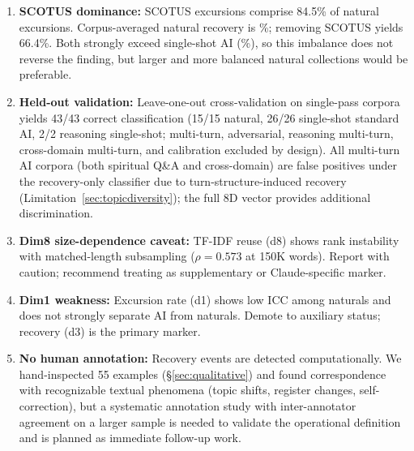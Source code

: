 \documentclass[11pt]{article}
\begin{document}
\begin{enumerate}
This identifies multi-turn generation structure as a boundary condition for the recovery-based classifier. However, multi-turn AI corpora remain distinguishable on other dimensions: d5 (compression SD) ranges 0.006--0.044, consistent with standard AI ranges and below the dialogue/channeling natural range ($\geq$0.044), though overlapping institutional/prose naturals (FOMC 0.011, Gutenberg 0.012). d8 (TF-IDF reuse) ranges 0.67--0.96, meaning the full 8-dimensional vector still provides additional discrimination.

\item \textbf{SCOTUS dominance:} SCOTUS excursions comprise 84.5\% of natural excursions. Corpus-averaged natural recovery is \recNatCorpusAvg\%; removing SCOTUS yields 66.4\%. Both strongly exceed single-shot AI (\recAISingleShot\%), so this imbalance does not reverse the finding, but larger and more balanced natural collections would be preferable.

\item \textbf{Held-out validation:} Leave-one-out cross-validation on single-pass corpora yields 43/43 correct classification (15/15 natural, 26/26 single-shot standard AI, 2/2 reasoning single-shot; multi-turn, adversarial, reasoning multi-turn, cross-domain multi-turn, and calibration excluded by design). All multi-turn AI corpora (both spiritual Q\&A and cross-domain) are false positives under the recovery-only classifier due to turn-structure-induced recovery (Limitation~\ref{sec:topicdiversity}); the full 8D vector provides additional discrimination.

\item \textbf{Dim8 size-dependence caveat:} TF-IDF reuse (d8) shows rank instability with matched-length subsampling ($\rho = 0.573$ at 150K words). Report with caution; recommend treating as supplementary or Claude-specific marker.

\item \textbf{Dim1 weakness:} Excursion rate (d1) shows low ICC among naturals and does not strongly separate AI from naturals. Demote to auxiliary status; recovery (d3) is the primary marker.

\item \textbf{No human annotation:} Recovery events are detected computationally. We hand-inspected 55 examples (\S\ref{sec:qualitative}) and found correspondence with recognizable textual phenomena (topic shifts, register changes, self-correction), but a systematic annotation study with inter-annotator agreement on a larger sample is needed to validate the operational definition and is planned as immediate follow-up work.


\end{enumerate}
\end{document}
